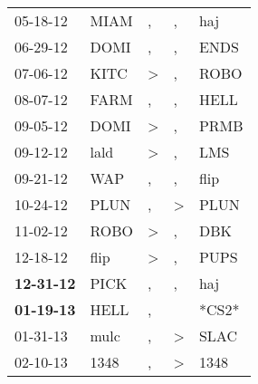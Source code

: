 \begin{supertabular}{p{0.07\textwidth}p{0.06\textwidth}p{0.02\textwidth}p{0.02\textwidth}p{0.06\textwidth}}
          05-18-12\textsuperscript{} &           MIAM\textsuperscript{} &                , &                , &            haj\textsuperscript{} \\
          06-29-12\textsuperscript{} &           DOMI\textsuperscript{} &                , &                , &           ENDS\textsuperscript{} \\
          07-06-12\textsuperscript{} &           KITC\textsuperscript{} &     \textgreater &                , &           ROBO\textsuperscript{} \\
          08-07-12\textsuperscript{} &           FARM\textsuperscript{} &                , &                , &           HELL\textsuperscript{} \\
          09-05-12\textsuperscript{} &           DOMI\textsuperscript{} &     \textgreater &                , &           PRMB\textsuperscript{} \\
          09-12-12\textsuperscript{} &           lald\textsuperscript{} &     \textgreater &                , &            LMS\textsuperscript{} \\
          09-21-12\textsuperscript{} &            WAP\textsuperscript{} &                , &                , &           flip\textsuperscript{} \\
          10-24-12\textsuperscript{} &           PLUN\textsuperscript{} &                , &     \textgreater &           PLUN\textsuperscript{} \\
          11-02-12\textsuperscript{} &           ROBO\textsuperscript{} &     \textgreater &                , &            DBK\textsuperscript{} \\
          12-18-12\textsuperscript{} &           flip\textsuperscript{} &     \textgreater &                , &           PUPS\textsuperscript{} \\
 \textbf{12-31-12\textsuperscript{}} &           PICK\textsuperscript{} &                , &                , &            haj\textsuperscript{} \\
 \textbf{01-19-13\textsuperscript{}} &           HELL\textsuperscript{} &                , &                  &                            *CS2* \\
          01-31-13\textsuperscript{} &           mulc\textsuperscript{} &                , &     \textgreater &           SLAC\textsuperscript{} \\
          02-10-13\textsuperscript{} &           1348\textsuperscript{} &                , &     \textgreater &           1348\textsuperscript{} \\

\end{supertabular}

